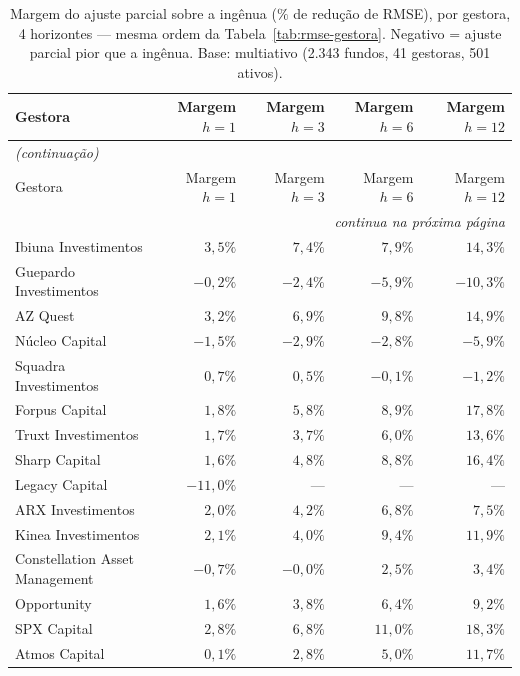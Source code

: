 \documentclass[11pt,a4paper]{article}
\begin{document}
\begin{center}\scriptsize
\begin{longtable}{@{}lrrrr@{}}
\caption{Margem do ajuste parcial sobre a ingênua ($\%$ de redução de RMSE), por gestora, 4
horizontes --- mesma ordem da Tabela~\ref{tab:rmse-gestora}. Negativo = ajuste parcial pior que
a ingênua. Base: multiativo (2.343 fundos, 41 gestoras, 501 ativos).}
\label{tab:margem-gestora}\\
\toprule
Gestora & Margem $h{=}1$ & Margem $h{=}3$ & Margem $h{=}6$ & Margem $h{=}12$ \\
\midrule
\endfirsthead
\multicolumn{5}{l}{\textit{(continuação)}}\\
\toprule
Gestora & Margem $h{=}1$ & Margem $h{=}3$ & Margem $h{=}6$ & Margem $h{=}12$ \\
\midrule
\endhead
\midrule
\multicolumn{5}{r}{\textit{continua na próxima página}}\\
\endfoot
\bottomrule
\endlastfoot
Ibiuna Investimentos & $3{,}5\%$ & $7{,}4\%$ & $7{,}9\%$ & $14{,}3\%$ \\
Guepardo Investimentos & $-0{,}2\%$ & $-2{,}4\%$ & $-5{,}9\%$ & $-10{,}3\%$ \\
AZ Quest & $3{,}2\%$ & $6{,}9\%$ & $9{,}8\%$ & $14{,}9\%$ \\
Núcleo Capital & $-1{,}5\%$ & $-2{,}9\%$ & $-2{,}8\%$ & $-5{,}9\%$ \\
Squadra Investimentos & $0{,}7\%$ & $0{,}5\%$ & $-0{,}1\%$ & $-1{,}2\%$ \\
Forpus Capital & $1{,}8\%$ & $5{,}8\%$ & $8{,}9\%$ & $17{,}8\%$ \\
Truxt Investimentos & $1{,}7\%$ & $3{,}7\%$ & $6{,}0\%$ & $13{,}6\%$ \\
Sharp Capital & $1{,}6\%$ & $4{,}8\%$ & $8{,}8\%$ & $16{,}4\%$ \\
Legacy Capital & $-11{,}0\%$ & --- & --- & --- \\
ARX Investimentos & $2{,}0\%$ & $4{,}2\%$ & $6{,}8\%$ & $7{,}5\%$ \\
Kinea Investimentos & $2{,}1\%$ & $4{,}0\%$ & $9{,}4\%$ & $11{,}9\%$ \\
Constellation Asset Management & $-0{,}7\%$ & $-0{,}0\%$ & $2{,}5\%$ & $3{,}4\%$ \\
Opportunity & $1{,}6\%$ & $3{,}8\%$ & $6{,}4\%$ & $9{,}2\%$ \\
SPX Capital & $2{,}8\%$ & $6{,}8\%$ & $11{,}0\%$ & $18{,}3\%$ \\
Atmos Capital & $0{,}1\%$ & $2{,}8\%$ & $5{,}0\%$ & $11{,}7\%$ \\

\end{longtable}
\end{center}
\end{document}
